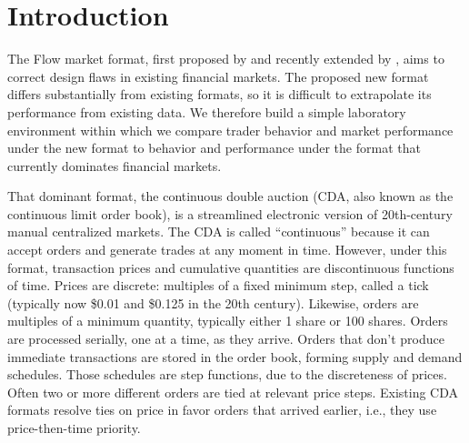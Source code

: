 \documentclass[12pt]{article}
\begin{document}



\newpage
\setcounter{page}{1}
\section{Introduction} \label{introduction}

The Flow market format, first proposed by \cite{Kyle2017} and recently extended by \cite{Budish2023}, aims to 
correct design flaws in existing financial markets. 
The proposed new format differs substantially from existing formats,
so it is difficult to extrapolate its performance from existing data. 
We therefore build a simple laboratory environment within which we compare trader behavior and market performance under the new format to behavior and performance under the format that currently dominates financial markets.

That dominant format, the continuous double auction (CDA, also known as the continuous limit order book), is a streamlined electronic version of 20th-century manual centralized markets. %
The CDA is called “continuous” because it can accept orders and generate trades at any moment in time. 
However, under this format, transaction prices and cumulative quantities are discontinuous functions of time. 
Prices are discrete: multiples of a fixed minimum step, called a tick (typically now \$0.01 and \$0.125 in the 20th century). 
Likewise, orders are multiples of a minimum quantity,
typically either 1 share or 100 shares. 
Orders are processed serially, one at a time, as they arrive. 
Orders that don't produce immediate transactions are stored in the order book, forming supply and demand schedules. 
Those schedules are step functions, due to the discreteness of prices. 
Often two or more different orders are tied at relevant price steps.
Existing CDA formats resolve ties on price in favor orders that arrived earlier, i.e., they use price-then-time priority. 
\end{document}
